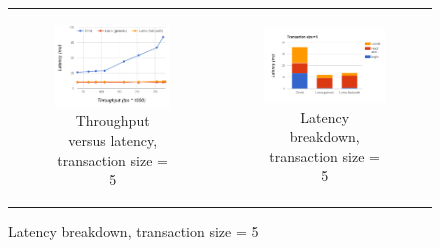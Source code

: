 \begin{figure}[t]
\begin{tabular}{cc}
  \begin{subfigure}[t]{0.5\textwidth}
	\includegraphics[width=\textwidth]{figs/thpt-latency-5.png}
	\caption[]{Throughput versus latency, transaction size = 5}
    \label{fig:tl-5}
  \end{subfigure} &

   \begin{subfigure}[t]{0.5\textwidth}
	\includegraphics[width=.9\textwidth]{figs/stack-tx5.png}
	\caption[]{Latency breakdown, transaction size = 5}
    \label{fig:stack-tx5}
  \end{subfigure} \\
  

\end{tabular}
\end{figure}
